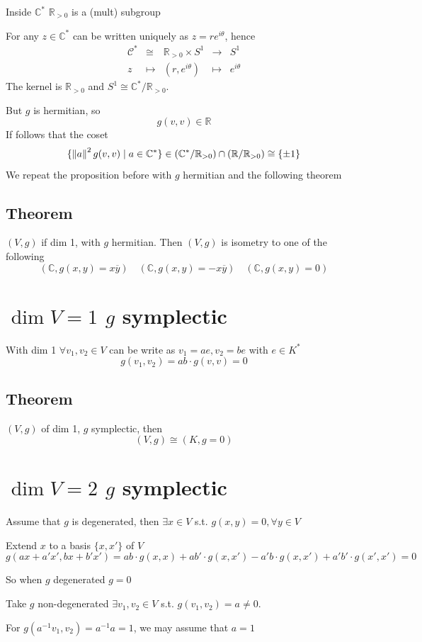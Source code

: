 \documentclass{book}
\begin{document}
Inside $\mathbb{C}^*$ $\mathbb{R}_{>0}$ is a (mult) subgroup

For any $z\in \mathbb{C}^*$ can be written uniquely as $z=re^{i\theta}$, hence
$$\begin{aligned}
    \mathcal{C}^* &\cong&\mathbb{R}_{>0}\times S^1&\rightarrow& S^1\\
    z& \mapsto&(r,e^{i\theta}) &\mapsto& e^{i\theta} 
\end{aligned}$$
The kernel is $\mathbb{R}_{>0}$ and $S^1\cong\mathbb{C}^*/\mathbb{R}_{>0}$.

But $g$ is hermitian, so$$g(v,v)\in \mathbb{R}$$
If follows that the coset $$\{\left\lVert a \right\rVert^2g(v,v)\mid a\in  \mathbb{C}^*\}\in (\mathbb{C}^*/\mathbb{R}_{>0})\cap(\mathbb{R}/\mathbb{R}_{>0})\cong\{\pm1\}$$
We repeat the proposition before with $g$ hermitian and the following theorem
\subsection{Theorem} $(V,g)$ if dim 1, with $g$ hermitian. Then $(V,g)$ is isometry to one of the following
$$(\mathbb{C},g(x,y)=x\overline{y})\quad(\mathbb{C},g(x,y)=-x\overline{y})\quad(\mathbb{C},g(x,y)=0)$$
\section{$\dim V=1$ $g$ symplectic}
With dim 1 $\forall v_1,v_2\in V$ can be write as $v_1=ae,v_2=be$ with $e\in K^*$$$g(v_1,v_2)=ab\cdot g(v,v)=0$$
\subsection{Theorem}$(V,g)$ of dim 1, $g$ symplectic, then $$(V,g)\cong(K,g=0)$$
\section{$\dim V=2$ $g$ symplectic}
Assume that $g$ is degenerated, then $\exists x\in V$ s.t. $g(x,y)=0,\forall y\in V$

Extend $x$ to a basis $\{x,x'\}$ of $V$
$$g(ax+a'x',bx+b'x')=ab\cdot g(x,x)+ab'\cdot g(x,x')-a'b\cdot g(x,x')+a'b'\cdot g(x',x')=0$$

So when $g$ degenerated $g=0$


Take $g$ non-degenerated $\exists v_1,v_2\in V$ s.t. $g(v_1,v_2)=a\neq0$. 

For $g(a^{-1}v_1,v_2)=a^{-1}a=1$, we may assume that $a=1$
\end{document}
